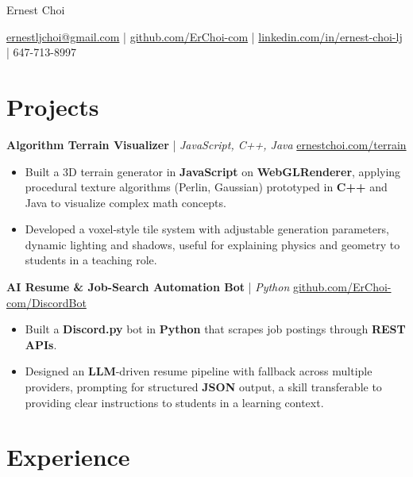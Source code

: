 \documentclass[11pt]{article}
\begin{document}
\centerline{\Huge Ernest Choi}
\vspace{3pt}

\centerline{%
  \href{mailto:ernestljchoi@gmail.com}{ernestljchoi@gmail.com} |
  \href{https://www.github.com/ErChoi-com}{github.com/ErChoi-com} |
  \href{https://www.linkedin.com/in/ernest-choi-lj}{linkedin.com/in/ernest-choi-lj} |
  647-713-8997
}


\section*{Projects}

\textbf{Algorithm Terrain Visualizer} | \textit{JavaScript, C++, Java} \hfill \href{https://www.ernestchoi.com/terrain/src/terrain.html}{ernestchoi.com/terrain} \\
\begin{itemize}
  \item Built a 3D terrain generator in \textbf{JavaScript} on \textbf{WebGLRenderer}, applying procedural texture algorithms (Perlin, Gaussian) prototyped in \textbf{C++} and Java to visualize complex math concepts.
  \item Developed a voxel-style tile system with adjustable generation parameters, dynamic lighting and shadows, useful for explaining physics and geometry to students in a teaching role.
\end{itemize}

\textbf{AI Resume \& Job-Search Automation Bot} | \textit{Python} \hfill \href{https://github.com/ErChoi-com/DiscordBot}{github.com/ErChoi-com/DiscordBot} \\
\begin{itemize}
  \item Built a \textbf{Discord.py} bot in \textbf{Python} that scrapes job postings through \textbf{REST APIs}.
  \item Designed an \textbf{LLM}-driven resume pipeline with fallback across multiple providers, prompting for structured \textbf{JSON} output, a skill transferable to providing clear instructions to students in a learning context.
\end{itemize}

\section*{Experience}
\end{document}

